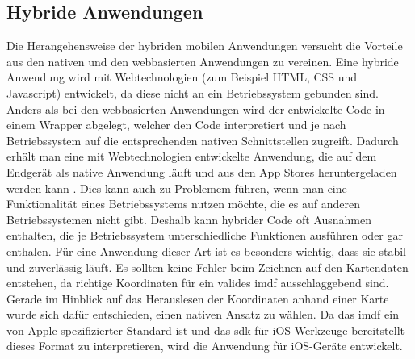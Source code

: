 \subsection{Hybride Anwendungen}
Die Herangehensweise der hybriden mobilen Anwendungen versucht die Vorteile aus den nativen und den webbasierten Anwendungen zu vereinen.
Eine hybride Anwendung wird mit Webtechnologien (zum Beispiel HTML, CSS und Javascript) entwickelt, da diese nicht an ein Betriebssystem gebunden sind.
Anders als bei den webbasierten Anwendungen wird der entwickelte Code in einem Wrapper abgelegt, welcher den Code interpretiert und je nach Betriebssystem auf die entsprechenden nativen Schnittstellen zugreift.
Dadurch erhält man eine mit Webtechnologien entwickelte Anwendung, die auf dem Endgerät als native Anwendung läuft und aus den App Stores heruntergeladen werden kann \parencite{HUY2017}.
Dies kann auch zu Problemem führen, wenn man eine Funktionalität eines Betriebssystems nutzen möchte, die es auf anderen Betriebssystemen nicht gibt.
Deshalb kann hybrider Code oft Ausnahmen enthalten, die je Betriebssystem unterschiedliche Funktionen ausführen oder gar enthalen.\pbreak%
%
Für eine Anwendung dieser Art ist es besonders wichtig, dass sie stabil und zuverlässig läuft.
Es sollten keine Fehler beim Zeichnen auf den Kartendaten entstehen, da richtige Koordinaten für ein valides \acl{imdf} ausschlaggebend sind.
Gerade im Hinblick auf das Herauslesen der Koordinaten anhand einer Karte wurde sich dafür entschieden, einen nativen Ansatz zu wählen.
Da das \acl{imdf} ein von Apple spezifizierter Standard ist und das \Gls{sdk} für iOS Werkzeuge bereitstellt dieses Format zu interpretieren, wird die Anwendung für iOS-Geräte entwickelt.
